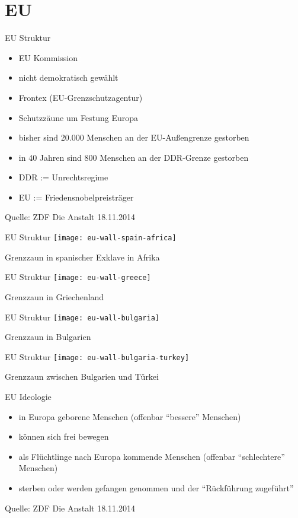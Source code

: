 \documentclass{beamer}
\begin{document}
	\section{EU}
	\begin{frame}{EU Struktur}
		\begin{itemize}
			\item EU Kommission
			\item nicht demokratisch gewählt
			\item Frontex (EU-Grenzschutzagentur)
			\item Schutzzäune um Festung Europa
			\item bisher sind 20.000 Menschen an der EU-Außengrenze gestorben
			\item in 40 Jahren sind 800 Menschen an der DDR-Grenze gestorben
			\item DDR := Unrechtsregime
			\item EU := Friedensnobelpreisträger
		\end{itemize}
		
		Quelle: ZDF Die Anstalt 18.11.2014
	\end{frame}
	\begin{frame}{EU Struktur}
		\centering
		\texttt{[image: eu-wall-spain-africa]}
		
		Grenzzaun in spanischer Exklave in Afrika
	\end{frame}
	\begin{frame}{EU Struktur}
		\centering
		\texttt{[image: eu-wall-greece]}
		
		Grenzzaun in Griechenland
	\end{frame}
	\begin{frame}{EU Struktur}
		\centering
		\texttt{[image: eu-wall-bulgaria]}
		
		Grenzzaun in Bulgarien
	\end{frame}
	\begin{frame}{EU Struktur}
		\centering
		\texttt{[image: eu-wall-bulgaria-turkey]}
		
		Grenzzaun zwischen Bulgarien und Türkei
	\end{frame}
	\begin{frame}{EU Ideologie}
		\begin{itemize}
			\item in Europa geborene Menschen (offenbar "`bessere"' Menschen)
			\item können sich frei bewegen
			\item als Flüchtlinge nach Europa kommende Menschen (offenbar "`schlechtere"' Menschen)
			\item sterben oder werden gefangen genommen und der "`Rückführung zugeführt"'
		\end{itemize}
		
		Quelle: ZDF Die Anstalt 18.11.2014
	\end{frame}
	
\end{document}
